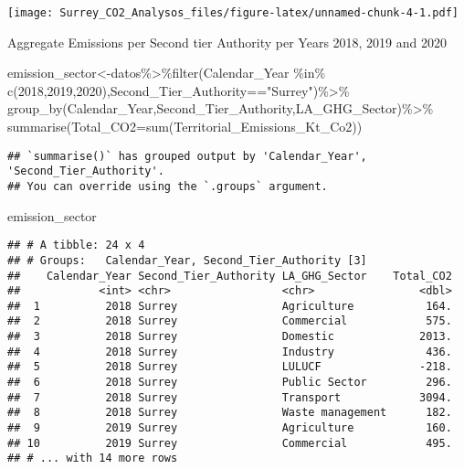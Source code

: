 \documentclass[
]{article}
\newenvironment{Shaded}{\begin{snugshade}}{\end{snugshade}}
\newcommand{\AttributeTok}[1]{\textcolor[rgb]{0.77,0.63,0.00}{#1}}
\newcommand{\DecValTok}[1]{\textcolor[rgb]{0.00,0.00,0.81}{#1}}
\newcommand{\FunctionTok}[1]{\textcolor[rgb]{0.00,0.00,0.00}{#1}}
\newcommand{\NormalTok}[1]{#1}
\newcommand{\OtherTok}[1]{\textcolor[rgb]{0.56,0.35,0.01}{#1}}
\newcommand{\SpecialCharTok}[1]{\textcolor[rgb]{0.00,0.00,0.00}{#1}}
\newcommand{\StringTok}[1]{\textcolor[rgb]{0.31,0.60,0.02}{#1}}
\begin{document}
\texttt{[image: Surrey\_CO2\_Analysos\_files/figure-latex/unnamed-chunk-4-1.pdf]}

Aggregate Emissions per Second tier Authority per Years 2018, 2019 and
2020

\begin{Shaded}
\begin{Highlighting}[]
\NormalTok{emission\_sector}\OtherTok{\textless{}{-}}\NormalTok{datos}\SpecialCharTok{\%\textgreater{}\%}\FunctionTok{filter}\NormalTok{(Calendar\_Year }\SpecialCharTok{\%in\%} \FunctionTok{c}\NormalTok{(}\DecValTok{2018}\NormalTok{,}\DecValTok{2019}\NormalTok{,}\DecValTok{2020}\NormalTok{),Second\_Tier\_Authority}\SpecialCharTok{==}\StringTok{"Surrey"}\NormalTok{)}\SpecialCharTok{\%\textgreater{}\%}
               \FunctionTok{group\_by}\NormalTok{(Calendar\_Year,Second\_Tier\_Authority,LA\_GHG\_Sector)}\SpecialCharTok{\%\textgreater{}\%}
               \FunctionTok{summarise}\NormalTok{(}\AttributeTok{Total\_CO2=}\FunctionTok{sum}\NormalTok{(Territorial\_Emissions\_Kt\_Co2))  }
\end{Highlighting}
\end{Shaded}

\begin{verbatim}
## `summarise()` has grouped output by 'Calendar_Year', 'Second_Tier_Authority'.
## You can override using the `.groups` argument.
\end{verbatim}

\begin{Shaded}
\begin{Highlighting}[]
\NormalTok{emission\_sector}
\end{Highlighting}
\end{Shaded}

\begin{verbatim}
## # A tibble: 24 x 4
## # Groups:   Calendar_Year, Second_Tier_Authority [3]
##    Calendar_Year Second_Tier_Authority LA_GHG_Sector    Total_CO2
##            <int> <chr>                 <chr>                <dbl>
##  1          2018 Surrey                Agriculture           164.
##  2          2018 Surrey                Commercial            575.
##  3          2018 Surrey                Domestic             2013.
##  4          2018 Surrey                Industry              436.
##  5          2018 Surrey                LULUCF               -218.
##  6          2018 Surrey                Public Sector         296.
##  7          2018 Surrey                Transport            3094.
##  8          2018 Surrey                Waste management      182.
##  9          2019 Surrey                Agriculture           160.
## 10          2019 Surrey                Commercial            495.
## # ... with 14 more rows
\end{verbatim}
\end{document}
